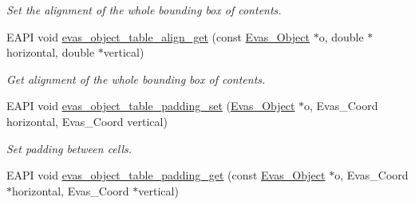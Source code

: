 \begin{DoxyCompactItemize}
\begin{DoxyCompactList}\small\item\em Set the alignment of the whole bounding box of contents. \item\end{DoxyCompactList}\item 
EAPI void \hyperlink{group__Evas__Object__Table_ga7a1ff64522920c2723675ca11d723d47}{evas\_\-object\_\-table\_\-align\_\-get} (const \hyperlink{group__Evas__Object__Group_ga9e19e6dd1f517a0ba437c0114d3e7c97}{Evas\_\-Object} $\ast$o, double $\ast$horizontal, double $\ast$vertical)\label{group__Evas__Object__Table_ga7a1ff64522920c2723675ca11d723d47}

\begin{DoxyCompactList}\small\item\em Get alignment of the whole bounding box of contents. \item\end{DoxyCompactList}\item 
EAPI void \hyperlink{group__Evas__Object__Table_ga6ea229f05036a9c5d30010ad40a30c66}{evas\_\-object\_\-table\_\-padding\_\-set} (\hyperlink{group__Evas__Object__Group_ga9e19e6dd1f517a0ba437c0114d3e7c97}{Evas\_\-Object} $\ast$o, Evas\_\-Coord horizontal, Evas\_\-Coord vertical)\label{group__Evas__Object__Table_ga6ea229f05036a9c5d30010ad40a30c66}

\begin{DoxyCompactList}\small\item\em Set padding between cells. \item\end{DoxyCompactList}\item 
EAPI void \hyperlink{group__Evas__Object__Table_gabe1af40fbd5e03068bc577e71939934a}{evas\_\-object\_\-table\_\-padding\_\-get} (const \hyperlink{group__Evas__Object__Group_ga9e19e6dd1f517a0ba437c0114d3e7c97}{Evas\_\-Object} $\ast$o, Evas\_\-Coord $\ast$horizontal, Evas\_\-Coord $\ast$vertical)\label{group__Evas__Object__Table_gabe1af40fbd5e03068bc577e71939934a}


\end{DoxyCompactItemize}
